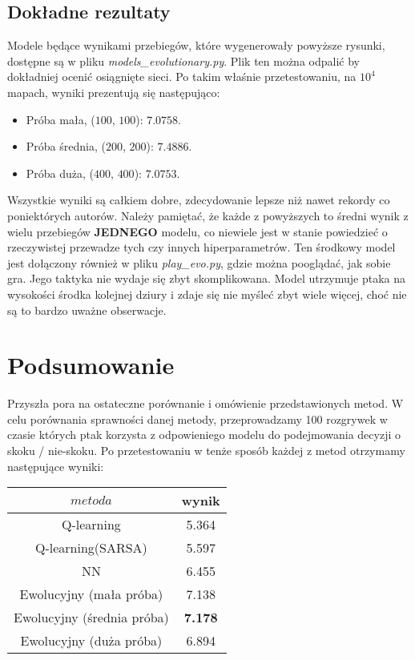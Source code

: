 \documentclass[12pt, A4]{article}
\begin{document}
\subsection{Dokładne rezultaty}
Modele będące wynikami przebiegów, które wygenerowały powyższe rysunki, dostępne są w pliku \textit{models\_evolutionary.py}. Plik ten można odpalić by dokładniej ocenić osiągnięte sieci. Po takim właśnie przetestowaniu, na $10^4$ mapach, wyniki prezentują się następująco:
\begin{itemize}
	\item Próba mała, ($100$, $100$): $7.0758$.
	\item Próba średnia, ($200$, $200$): $7.4886$.
	\item Próba duża, ($400$, $400$): $7.0753$.
\end{itemize}
Wszystkie wyniki są całkiem dobre, zdecydowanie lepsze niż nawet rekordy co poniektórych autorów. Należy pamiętać, że każde z powyższych to średni wynik z wielu przebiegów \textbf{JEDNEGO} modelu, co niewiele jest w stanie powiedzieć o rzeczywistej przewadze tych czy innych hiperparametrów.
\newline\newline
Ten środkowy model jest dołączony również w pliku \textit{play\_evo.py}, gdzie można pooglądać, jak sobie gra.
\newline
Jego taktyka nie wydaje się zbyt skomplikowana. Model utrzymuje ptaka na wysokości środka kolejnej dziury i zdaje się nie myśleć zbyt wiele więcej, choć nie są to bardzo uważne obserwacje.


\section{Podsumowanie}
Przyszła pora na ostateczne porównanie i omówienie przedstawionych metod. W celu porównania sprawności danej metody, przeprowadzamy 100 rozgrywek w czasie których ptak korzysta z odpowieniego modelu do podejmowania decyzji o skoku / nie-skoku. Po przetestowaniu w tenże sposób każdej z metod otrzymamy następujące wyniki:
	
	\begin{center}	
	\begin{tabular}{||c c||}
	\hline
	 $metoda$ & wynik \\ [0.5ex]
	\hline\hline
	 Q-learning & 5.364 \\
	 Q-learning(SARSA) & 5.597 \\
	 NN & 6.455 \\
	 Ewolucyjny (mała próba) & 7.138 \\
	 Ewolucyjny (średnia próba) & \textbf{7.178} \\
	 Ewolucyjny (duża próba) & 6.894 \\ [1ex]
	 \hline
	\end{tabular}
	\end{center}
\end{document}
